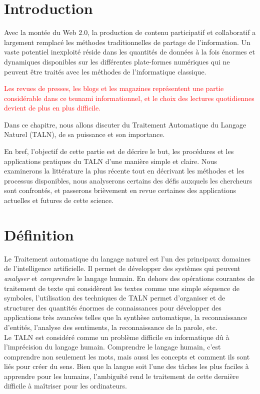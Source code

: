 
\newpage
{}
\section{Introduction}
Avec la montée du Web 2.0, la production de contenu participatif et collaboratif a largement remplacé les méthodes traditionnelles de partage de l'information. Un vaste potentiel inexploité réside dans les quantités de données à la fois énormes et dynamiques disponibles sur les différentes plate-formes numériques qui ne peuvent être traités avec les méthodes de l'informatique classique.

\textcolor{red}{Les revues de presses, les blogs et les magazines représentent une partie considérable dans ce tsunami informationnel, et le choix des lectures quotidiennes devient de plus en plus difficile.}

Dans ce chapitre, nous allons discuter du Traitement Automatique du Langage Naturel (TALN), de sa puissance et son importance.\

En bref, l'objectif de cette partie est de décrire le but, les procédures et les applications pratiques du TALN d'une manière simple et claire. Nous examinerons la littérature la plus récente tout en décrivant les méthodes et les processus disponibles, nous analyserons certains des défis auxquels les chercheurs sont confrontés, et passerons brièvement en revue certaines des applications actuelles et futures de cette science.

\section{Définition}
Le Traitement automatique du langage naturel est l'un des principaux domaines de l'intelligence artificielle. Il permet de développer des systèmes qui peuvent \emph{analyser} et \emph{comprendre} le langage humain. En dehors des opérations courantes de traitement de texte qui considèrent les textes comme une simple séquence de symboles, l'utilisation des techniques de TALN permet d'organiser et de structurer des quantités énormes de connaissances pour développer des applications très avancées telles que la synthèse automatique, la reconnaissance d'entités, l'analyse des sentiments, la reconnaissance de la parole, etc.\\

Le TALN est considéré comme un problème difficile en informatique dû à l'imprécision du langage humain. Comprendre le langage humain, c'est comprendre non seulement les mots, mais aussi les concepts et comment ils sont liés pour créer du sens. Bien que la langue soit l'une des tâches les plus faciles à apprendre pour les humains, l'ambiguïté rend le traitement de cette dernière difficile à maîtriser pour les ordinateurs.

